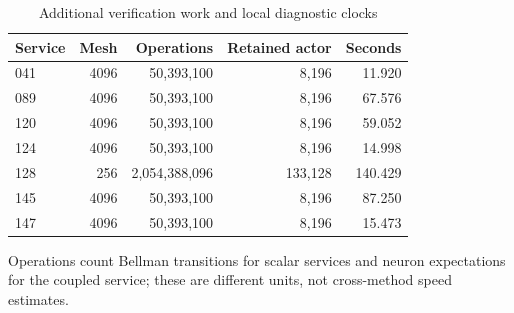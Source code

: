 \begin{table}[htbp]
\centering\small
\caption{Additional verification work and local diagnostic clocks}
\label{tab:diagwork}
\begin{tabular}{lrrrr}
\toprule
Service & Mesh & Operations & Retained actor & Seconds\\
\midrule
041 & 4096 & 50,393,100 & 8,196 & 11.920\\
089 & 4096 & 50,393,100 & 8,196 & 67.576\\
120 & 4096 & 50,393,100 & 8,196 & 59.052\\
124 & 4096 & 50,393,100 & 8,196 & 14.998\\
128 & 256 & 2,054,388,096 & 133,128 & 140.429\\
145 & 4096 & 50,393,100 & 8,196 & 87.250\\
147 & 4096 & 50,393,100 & 8,196 & 15.473\\
\bottomrule
\end{tabular}
\end{table}
Operations count Bellman transitions for scalar services and neuron expectations for the coupled service; these are different units, not cross-method speed estimates.
